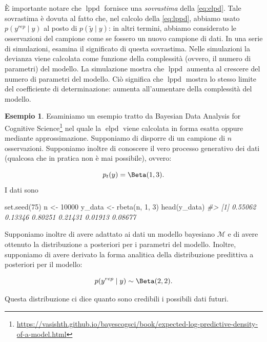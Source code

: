 \documentclass[
  11pt,
]{krantz}
\makeatletter
\newenvironment{Shaded}{\begin{snugshade}}{\end{snugshade}}
\newcommand{\CommentTok}[1]{\textcolor[rgb]{0.37,0.37,0.37}{\textit{#1}}}
\newcommand{\DecValTok}[1]{\textcolor[rgb]{0.06,0.06,0.06}{#1}}
\newcommand{\FunctionTok}[1]{\textcolor[rgb]{0,0,0}{#1}}
\newcommand{\NormalTok}[1]{#1}
\newcommand{\OtherTok}[1]{\textcolor[rgb]{0.37,0.37,0.37}{#1}}
\renewcommand{\href}[2]{#2\footnote{\url{#1}}}
\newenvironment{kframe}{%
\medskip{}
\setlength{\fboxsep}{.8em}
 \def\at@end@of@kframe{}%
 \ifinner\ifhmode%
  \def\at@end@of@kframe{\end{minipage}}%
  \begin{minipage}{\columnwidth}%
 \fi\fi%
 \def\FrameCommand##1{\hskip\@totalleftmargin \hskip-\fboxsep
 \colorbox{shadecolor}{##1}\hskip-\fboxsep
     \hskip-\linewidth \hskip-\@totalleftmargin \hskip\columnwidth}%
 \MakeFramed {\advance\hsize-\width
   \@totalleftmargin\z@ \linewidth\hsize
   \@setminipage}}%
 {\par\unskip\endMakeFramed%
 \at@end@of@kframe}
\renewenvironment{Shaded}{\begin{kframe}}{\end{kframe}}
\DeclareMathOperator{\elpd}{elpd} %
\DeclareMathOperator{\lppd}{lppd} %
\theoremstyle{definition}
\theoremstyle{definition}
\newtheorem{example}{Esempio}[chapter]
\theoremstyle{definition}
\theoremstyle{definition}
\theoremstyle{remark}
\makeatother
\begin{document}
È importante notare che \(\lppd\) fornisce una \emph{sovrastima} della \eqref{eq:elpd}. Tale sovrastima è dovuta al fatto che, nel calcolo della \eqref{eq:lppd}, abbiamo usato \(p(y^{rep} \mid y)\) al posto di \(p(\tilde{y} \mid y)\): in altri termini, abbiamo considerato le osservazioni del campione come se fossero un nuovo campione di dati. In una serie di simulazioni, \citet{McElreath_rethinking} esamina il significato di questa sovrastima. Nelle simulazioni la devianza viene calcolata come funzione della complessità (ovvero, il numero di parametri) del modello. La simulazione mostra che \(\lppd\) aumenta al crescere del numero di parametri del modello. Ciò significa che \(\lppd\) mostra lo stesso limite del coefficiente di determinazione: aumenta all'aumentare della complessità del modello.

\begin{example}

Esaminiamo un esempio tratto da \href{https://vasishth.github.io/bayescogsci/book/expected-log-predictive-density-of-a-model.html}{Bayesian Data Analysis for Cognitive Science} nel quale la \(\elpd\) viene calcolata in forma esatta oppure mediante approssimazione. Supponiamo di disporre di un campione di \(n\) osservazioni. Supponiamo inoltre di conoscere il vero processo generativo dei dati (qualcosa che in pratica non è mai possibile), ovvero:

\[
p_t(y) = \Beta(1, 3).
\] I dati sono

\begin{Shaded}
\begin{Highlighting}[]
\FunctionTok{set.seed}\NormalTok{(}\DecValTok{75}\NormalTok{)}
\NormalTok{n }\OtherTok{\textless{}{-}} \DecValTok{10000}
\NormalTok{y\_data }\OtherTok{\textless{}{-}} \FunctionTok{rbeta}\NormalTok{(n, }\DecValTok{1}\NormalTok{, }\DecValTok{3}\NormalTok{)}
\FunctionTok{head}\NormalTok{(y\_data)}
\CommentTok{\#\textgreater{} [1] 0.55062 0.13346 0.80251 0.21431 0.01913 0.08677}
\end{Highlighting}
\end{Shaded}

Supponiamo inoltre di avere adattato ai dati un modello bayesiano \(\mathcal{M}\) e di avere ottenuto la distribuzione a posteriori per i parametri del modello. Inoltre, supponiamo di avere derivato la forma analitica della distribuzione predittiva a posteriori per il modello:

\[
p(y^{rep} \mid y) \sim \Beta(2, 2).
\]

Questa distribuzione ci dice quanto sono credibili i possibili dati futuri.


\end{example}
\end{document}
